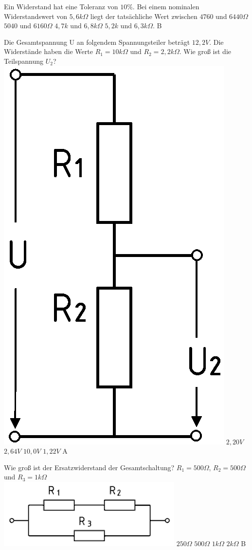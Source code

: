 {Ein Widerstand hat eine Toleranz von $10 \%$. Bei einem nominalen Widerstandswert von $5,6 k\Omega$ liegt der tatsächliche Wert zwischen}%
{$4760$ und $6440 \Omega$}%
{$5040$ und $6160 \Omega$}%
{$4,7 k$ und $6,8 k\Omega$}%
{$5,2 k$ und $6,3 k\Omega.$}%
{B}%

{Die Gesamtspannung U an folgendem Spannungsteiler beträgt $12,2V$. Die
Widerstände haben die Werte $R_1 = 10k\Omega$ und $R_2 = 2,2k\Omega$. Wie groß
ist die Teilspannung $U_2$?\\ \includegraphics[scale=0.1]{Spannungsteiler.png}}%
{$2,20V$}%
{$2,64V$}%
{$10,0V$}%
{$1,22V$}%
{A}%

{Wie groß ist der Ersatzwiderstand der Gesamtschaltung? 
$R_1 = 500\Omega$, $R_2 = 500\Omega$ und $R_3 = 1k\Omega$\\
\includegraphics[scale=0.3]{Parallelschaltung.png}}%
{$250\Omega$}%
{$500\Omega$}%
{$1k\Omega$}%
{$2k\Omega$}%
{B}%

